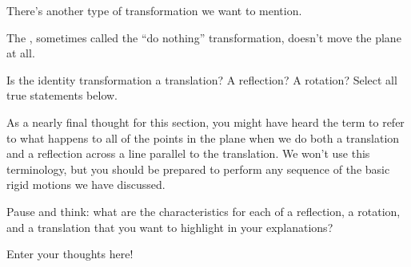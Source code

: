 \documentclass{ximera}
\begin{document}
There's another type of transformation we want to mention.
\begin{definition}
The , sometimes called the ``do nothing'' transformation, doesn’t move the plane at all.
\end{definition}

\begin{question}
Is the identity transformation a translation? A reflection? A rotation? Select all true statements below.
\begin{selectAll}
\end{selectAll}
\end{question}

As a nearly final thought for this section, you might have heard the term  to refer to what happens to all of the points in the plane when we do both a translation and a reflection across a line parallel to the translation. We won't use this terminology, but you should be prepared to perform any sequence of the basic rigid motions we have discussed.


\begin{question}
Pause and think: what are the characteristics for each of a reflection, a rotation, and a translation that you want to highlight in your explanations?
\begin{freeResponse}
Enter your thoughts here!
\end{freeResponse}
\end{question}
\end{document}
